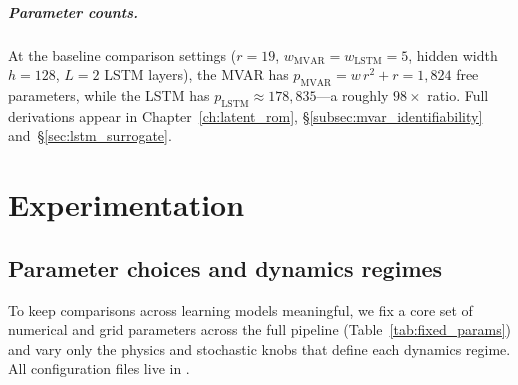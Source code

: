 \documentclass{report}
\theoremstyle{plain}
\theoremstyle{remark}
\numberwithin{equation}{section}              %
\begin{document}
\paragraph{Parameter counts.}
\label{subsec:param_counts}
At the baseline comparison settings
($r{=}19$, $w_{\mathrm{MVAR}}{=}w_{\mathrm{LSTM}}{=}5$, hidden width
$h{=}128$, $L{=}2$ LSTM layers), the MVAR has
$p_{\mathrm{MVAR}} = w\,r^2 + r = 1{,}824$ free parameters, while the
LSTM has $p_{\mathrm{LSTM}} \approx 178{,}835$---a roughly $98\times$
ratio.  Full derivations appear in
Chapter~\ref{ch:latent_rom}, \S\ref{subsec:mvar_identifiability}
and~\S\ref{sec:lstm_surrogate}.
 
%
\chapter{Experimentation}
\label{ch:experimentation}

\section{Parameter choices and dynamics regimes}
\label{sec:params_fixed}

To keep comparisons across learning models meaningful, we fix a core set of
numerical and grid parameters across the full pipeline
(Table~\ref{tab:fixed_params}) and vary only the physics and stochastic knobs
that define each dynamics regime.  All configuration files live in
.
\end{document}
